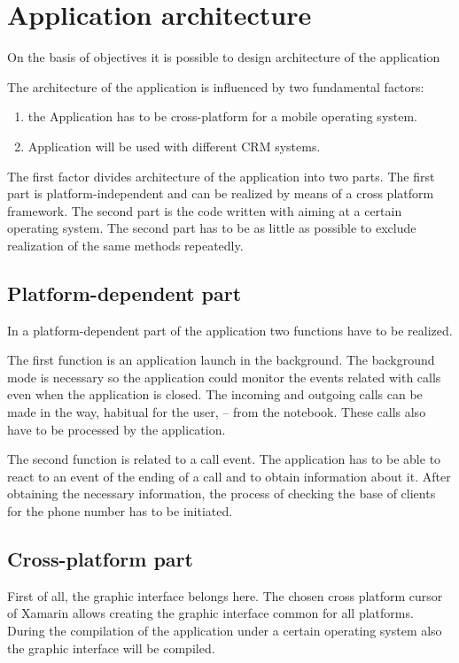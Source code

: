 \section{Application architecture}\label{sec:architecture}

On the basis of objectives it is possible to design architecture of the application

The architecture of the application is influenced by two fundamental factors:

\begin {enumerate}
\item the Application has to be cross-platform for a mobile operating system.
\item Application will be used with different CRM systems.
\end {enumerate}

The first factor divides architecture of the application into two parts. The first part is platform-independent and can be realized by means of a cross platform framework. The second part is the code written with aiming at a certain operating system. The second part has to be as little as possible to exclude realization of the same methods repeatedly.

\subsection{Platform-dependent part}

In a platform-dependent part of the application two functions have to be realized.

The first function is an application launch in the background. The background mode is necessary so the application could monitor the events related with calls even when the application is closed. The incoming and outgoing calls can be made in the way, habitual for the user, – from the notebook. These calls also have to be processed by the application.

The second function is related to a call event. The application has to be able to react to an event of the ending of a call and to obtain information about it. After obtaining the necessary information, the process of checking the base of clients for the phone number has to be initiated.

\subsection{Cross-platform part}

First of all, the graphic interface belongs here. The chosen cross platform cursor of Xamarin allows creating the graphic interface common for all platforms. During the compilation of the application under a certain operating system also the graphic interface will be compiled.


